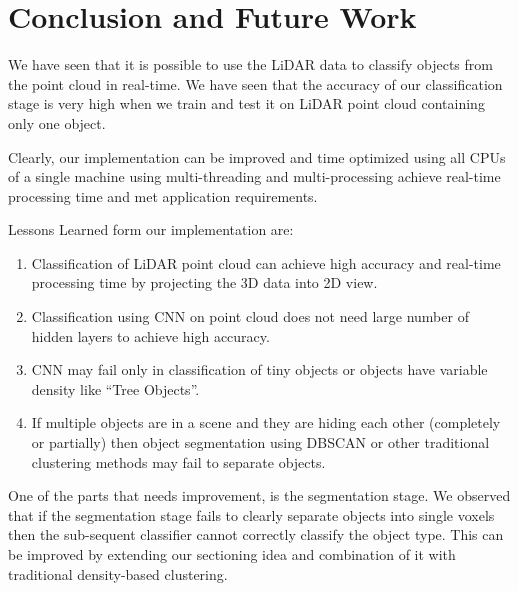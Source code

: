 \section{Conclusion and Future Work}\label{sec:conclusion}
We have seen that it is possible to use the LiDAR data to classify objects from the point cloud in real-time. 
We have seen that the accuracy of our classification stage is very high when we train and test it on LiDAR point cloud containing only one object.  


Clearly, our implementation can be improved and time optimized using all CPUs of a single machine using multi-threading and multi-processing achieve real-time processing time and met application requirements.    


Lessons Learned form our implementation are: 

\begin{enumerate}
  \item Classification of LiDAR point cloud can achieve high accuracy and real-time processing time by projecting the 3D data into 2D view. 
  \item Classification using CNN on point cloud does not need large number of hidden layers to achieve high accuracy.
  \item CNN may fail only in classification of tiny objects or objects have variable density like ``Tree Objects''.   
  \item If multiple objects are in a scene and they are hiding each other (completely or partially) then object segmentation using DBSCAN or other traditional clustering methods may fail to separate objects.   
\end{enumerate}

One of the parts that needs improvement, is the segmentation stage. We observed that if the segmentation stage fails to clearly separate objects into single voxels then the sub-sequent classifier cannot correctly classify the object type. This can be improved by extending our sectioning idea and combination of it with traditional density-based clustering. 
